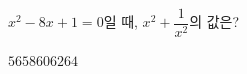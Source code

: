 $x^2-8x+1=0$일 때, $x^2+\dfrac{1}{x^2}$의 값은?
\begin{choices32}{$56$}{$58$}{$60$}{$62$}{$64$}\end{choices32}
